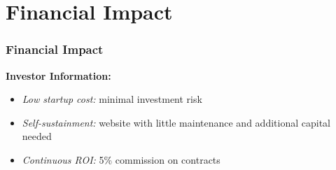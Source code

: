 \documentclass{beamer}
\begin{document}







\section{Financial Impact}

\begin{frame}
\frametitle{Financial Impact}
\textbf{Investor Information: }  
\begin{itemize}
\item\textit{Low startup cost:} minimal investment risk 
\item\textit{Self-sustainment:} website with little maintenance and additional capital needed 
\item\textit{Continuous ROI:} 5\% commission on contracts 

\end{itemize}
\end{frame}


\end{document}
